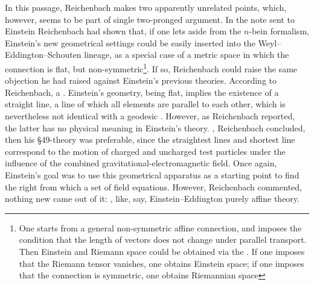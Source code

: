 \documentclass[draft]{article}
\newcommand{\manu}[1]{\citep[#1]{Reichenbach1928b}}
\newcommand{\nbein}{$n$-bein\xspace}
\begin{document}
In this passage, Reichenbach makes two apparently unrelated points, which, however, seems to be part of single two-pronged argument. In the note sent to Einstein Reichenbach had shown that, if one lets aside from the \nbein formalism, Einstein's new geometrical settings could be easily inserted into the Weyl--Eddington--Schouten lineage, as a special case of a metric space in which the connection is flat, but non-symmetric\footnote{One starts from a general non-symmetric affine \Gtmn connection, and imposes the condition that the length of vectors does not change under parallel transport. Then Einstein and Riemann space could be obtained via the  \manu{5}. If one imposes that the Riemann tensor vanishes, one obtains Einstein space; if one imposes that the connection is symmetric, one obtains Riemannian space}. If so, Reichenbach could raise the same objection he had raised against Einstein's previous theories. According to Reichenbach, a  \manu{7}. Einstein's geometry, being flat, implies the existence of a straight line, a line of which all elements are parallel to each other, which is nevertheless not identical with a geodesic \citep[224]{Einstein19282}. However, as Reichenbach reported, the latter has no physical meaning in Einstein's theory.  , Reichenbach concluded, then his \S49-theory was preferable, since the straightest lines and shortest line correspond to the motion of charged and uncharged test particles under the influence of the combined gravitational-electromagnetic field. Once again, Einstein's goal was to use this geometrical apparatus as a starting point to find the right  from which a set of field equations. However, Reichenbach commented, nothing new came out of it:  \manu{6}, like, say, Einstein--Eddington purely affine theory. 



\end{document}
